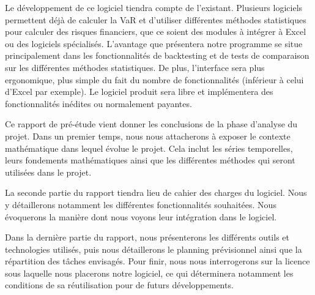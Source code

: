 Le développement de ce logiciel tiendra compte de l’existant. Plusieurs logiciels permettent déjà de calculer la VaR et d’utiliser différentes méthodes statistiques pour calculer des risques financiers, que ce soient des modules à intégrer à Excel ou des logiciels spécialisés. 
L’avantage que présentera notre programme se situe principalement dans les fonctionnalités de backtesting et de tests de comparaison sur les différentes méthodes statistiques. De plus, l’interface sera plus ergonomique, plus simple du fait du nombre de fonctionnalités (inférieur à celui d’Excel par exemple). Le logiciel produit sera libre et implémentera des fonctionnalités inédites ou normalement payantes.

Ce rapport de pré-étude vient donner les conclusions de la phase d’analyse du projet. Dans un premier temps, nous nous attacherons à exposer le contexte mathématique dans lequel évolue le projet. Cela inclut les séries temporelles, leurs fondements mathématiques ainsi que les différentes méthodes qui seront utilisées dans le projet.

La seconde partie du rapport tiendra lieu de cahier des charges du logiciel. Nous y détaillerons notamment les différentes fonctionnalités souhaitées. Nous évoquerons la manière dont nous voyons leur intégration dans le logiciel.

Dans la dernière partie du rapport, nous présenterons les différents outils et technologies utilisés, puis nous détaillerons le planning prévisionnel ainsi que la répartition des tâches envisagés. Pour finir, nous nous interrogerons sur la licence sous laquelle nous placerons notre logiciel, ce qui déterminera notamment les conditions de sa réutilisation pour de futurs développements.

